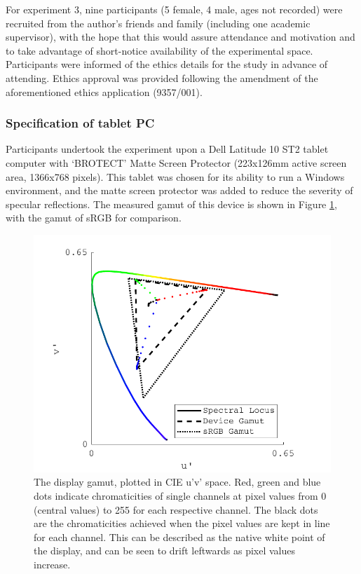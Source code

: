 For experiment 3, nine participants (5 female, 4 male, ages not recorded) were recruited from the author's friends and family (including one academic supervisor), with the hope that this would assure attendance and motivation and to take advantage of short-notice availability of the experimental space. Participants were informed of the ethics details for the study in advance of attending. Ethics approval was provided following the amendment of the aforementioned ethics application (9357/001).


\subsubsection{Specification of tablet PC}

Participants undertook the experiment upon a Dell Latitude 10 ST2 tablet computer with `BROTECT' Matte Screen Protector (223x126mm active screen area, 1366x768 pixels). This tablet was chosen for its ability to run a Windows environment, and the matte screen protector was added to reduce the severity of specular reflections. The measured gamut of this device is shown in Figure \ref{fig:gamut}, with the gamut of sRGB for comparison.

\begin{figure}[hbp]
\includegraphics[max width=\textwidth]{figs/tablet/gamut.pdf}
\caption{The display gamut, plotted in CIE u'v' space. Red, green and blue dots indicate chromaticities of single channels at pixel values from 0 (central values) to 255 for each respective channel. The black dots are the chromaticities achieved when the pixel values are kept in line for each channel. This can be described as the native white point of the display, and can be seen to drift leftwards as pixel values increase.}
\label{fig:gamut}
\end{figure}

